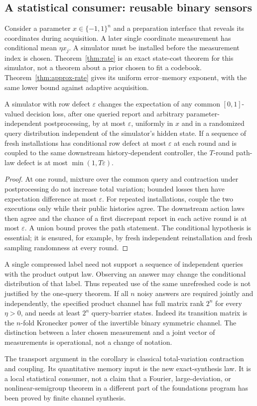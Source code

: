 \subsection{A statistical consumer: reusable binary sensors}
Consider a parameter $x\in\{-1,1\}^n$ and a preparation interface that
reveals its coordinates during acquisition. A later single coordinate
measurement has conditional mean $\eta x_j$. A simulator must be
installed before the measurement index is chosen. Theorem~\ref{thm:rate}
is an exact state-cost theorem for this simulator, not a theorem about
a prior chosen to fit a codebook. Theorem~\ref{thm:approx-rate} gives
its uniform error--memory exponent, with the same lower bound against
adaptive acquisition.

\begin{corollary}
\label{cor:consumer}
A simulator with row defect $\varepsilon$ changes the expectation of
any common $[0,1]$-valued decision loss, after one queried report and
arbitrary parameter-independent postprocessing, by at most $\varepsilon$,
uniformly in $x$ and in a randomized query distribution independent of
the simulator's hidden state. If a sequence of fresh installations has
conditional row defect at most $\varepsilon$ at each round and is
coupled to the same downstream history-dependent controller, the
$T$-round path-law defect is at most $\min(1,T\varepsilon)$.
\end{corollary}
\begin{proof}
At one round, mixture over the common query and contraction under
postprocessing do not increase total variation; bounded losses then
have expectation difference at most $\varepsilon$. For repeated
installations, couple the two executions only while their public
histories agree. The downstream action laws then agree and the chance
of a first discrepant report in each active round is at most
$\varepsilon$. A union bound proves the path statement. The conditional
hypothesis is essential; it is ensured, for example, by fresh independent
reinstallation and fresh sampling randomness at every round.
\end{proof}
A single compressed label need not support a sequence of independent
queries with the product output law. Observing an answer may change the
conditional distribution of that label. Thus repeated use of the same
unrefreshed code is not justified by the one-query theorem. If all $n$
noisy answers are required jointly and independently, the specified
product channel has full matrix rank $2^n$ for every $\eta>0$, and
needs at least $2^n$ query-barrier states. Indeed its transition matrix
is the $n$-fold Kronecker power of the invertible binary symmetric
channel. The distinction between a later chosen measurement and a
joint vector of measurements is operational, not a change of notation.

The transport argument in the corollary is classical total-variation
contraction and coupling. Its quantitative memory input is the new
exact-synthesis law. It is a local statistical consumer, not a claim
that a Fourier, large-deviation, or nonlinear-semigroup theorem in a
different part of the foundations program has been proved by finite
channel synthesis.
